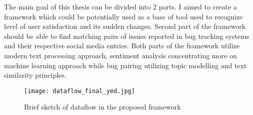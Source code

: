 The main goal of this thesis can be divided into 2 parts. I aimed to create a framework which could be potentially used as a base of tool used to recognize level of user satisfaction and its sudden changes. Second part of the framework should be able to find matching pairs of issues reported in bug tracking systems and their respective social media entries. Both parts of the framework utilize modern text processing approach, sentiment analysis concentrating more on machine learning approach while bug pairing utilizing topic modelling and text similarity principles.

\begin{figure}[H]%
    \centering
	\texttt{[image: dataflow\_final\_yed.jpg]}
    \caption{Brief sketch of dataflow in the proposed framework}%
    \label{fig:frameworkDataflow}%
\end{figure}

